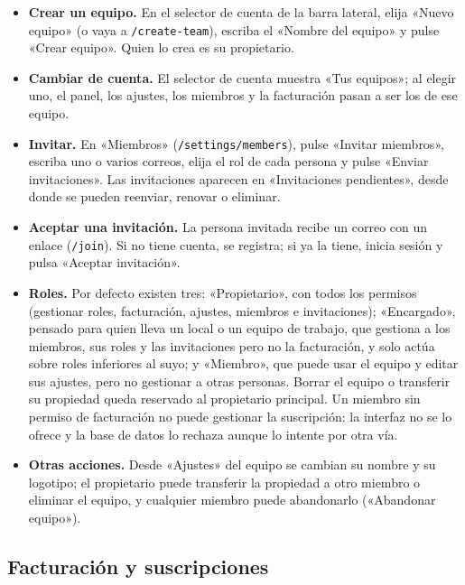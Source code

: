 \begin{itemize}
  \item \textbf{Crear un equipo.} En el selector de cuenta de la barra
        lateral, elija «Nuevo equipo» (o vaya a \texttt{/create-team}), escriba
        el «Nombre del equipo» y pulse «Crear equipo». Quien lo crea es su
        propietario.
  \item \textbf{Cambiar de cuenta.} El selector de cuenta muestra «Tus
        equipos»; al elegir uno, el panel, los ajustes, los miembros y la
        facturación pasan a ser los de ese equipo.
  \item \textbf{Invitar.} En «Miembros» (\texttt{/settings/members}), pulse
        «Invitar miembros», escriba uno o varios correos, elija el rol de cada
        persona y pulse «Enviar invitaciones». Las invitaciones aparecen en
        «Invitaciones pendientes», desde donde se pueden reenviar, renovar o
        eliminar.
  \item \textbf{Aceptar una invitación.} La persona invitada recibe un correo
        con un enlace (\texttt{/join}). Si no tiene cuenta, se registra; si ya
        la tiene, inicia sesión y pulsa «Aceptar invitación».
  \item \textbf{Roles.} Por defecto existen tres: «Propietario», con todos
        los permisos (gestionar roles, facturación, ajustes, miembros e
        invitaciones); «Encargado», pensado para quien lleva un local o un
        equipo de trabajo, que gestiona a los miembros, sus roles y las
        invitaciones pero no la facturación, y solo actúa sobre roles
        inferiores al suyo; y «Miembro», que puede usar el equipo y editar
        sus ajustes, pero no gestionar a otras personas. Borrar el equipo o
        transferir su propiedad queda reservado al propietario principal. Un miembro sin permiso de facturación no puede
        gestionar la suscripción: la interfaz no se lo ofrece y la base de
        datos lo rechaza aunque lo intente por otra vía.
  \item \textbf{Otras acciones.} Desde «Ajustes» del equipo se cambian su
        nombre y su logotipo; el propietario puede transferir la propiedad a
        otro miembro o eliminar el equipo, y cualquier miembro puede
        abandonarlo («Abandonar equipo»).
\end{itemize}

\subsection{Facturación y suscripciones}
\label{sec:ug-facturacion}

